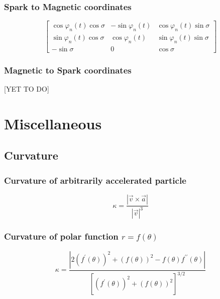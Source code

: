 \documentclass{article}
\newcommand{\phase}{\varphi}
\begin{document}
\subsubsection{Spark to Magnetic coordinates}
\begin{equation}
    \begin{bmatrix}
        \cos\phase_n(t)\cos\sigma & -\sin\phase_n(t) & \cos\phase_n(t)\sin\sigma \\
        \sin\phase_n(t)\cos\sigma &  \cos\phase_n(t) & \sin\phase_n(t)\sin\sigma \\
        -\sin\sigma          & 0           & \cos\sigma
    \end{bmatrix}
\end{equation}

\subsubsection{Magnetic to Spark coordinates}

[YET TO DO]

\section{Miscellaneous}

\subsection{Curvature}

\subsubsection{Curvature of arbitrarily accelerated particle}

\begin{equation}
    \kappa = \frac{|\vec{v}\times\vec{a}|}{|\vec{v}|^3}
\end{equation}

\subsubsection{Curvature of polar function $r = f(\theta)$}

\begin{equation}
    \kappa = \frac{|2(f^\prime(\theta))^2 + (f(\theta))^2 - f(\theta)f^{\prime\prime}(\theta)|}{\left[(f^\prime(\theta))^2 + (f(\theta))^2\right]^{3/2}}
    \label{eqn:curvature_polar}
\end{equation}
\end{document}
